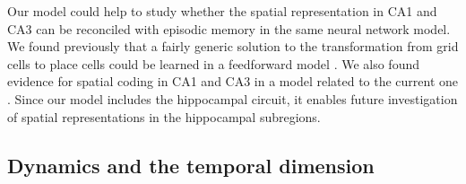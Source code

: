 \documentclass[utf8]{frontiersSCNS} %
\begin{document}
Our model could help to study whether the spatial representation in CA1 and CA3 can be reconciled with episodic memory in the same neural network model. We found previously that a fairly generic solution to the transformation from grid cells to place cells could be learned in a feedforward model \citep{cheng2011structure}. We also found evidence for spatial coding in CA1 and CA3 in a model related to the current one \citep{neher2015memory}. Since our model includes the hippocampal circuit, it enables future investigation of spatial representations in the hippocampal subregions. 




\subsection{Dynamics and the temporal dimension}  
\end{document}
